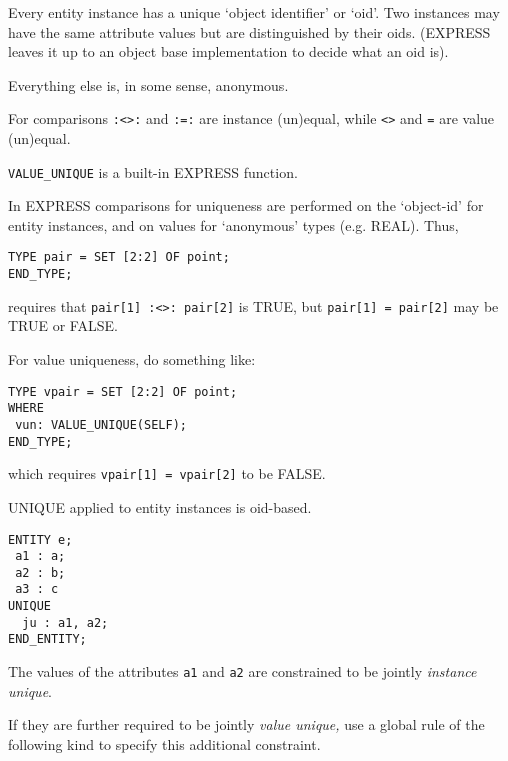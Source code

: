 \begin{remarks}
\remintro
{}

    Every entity instance has a unique `object identifier' or `oid'.
Two instances may have the same attribute values but are distinguished
by their oids. (EXPRESS leaves it up to an object base implementation
to decide what an oid is).

    Everything else is, in some sense, anonymous.

    For comparisons \verb?:<>:? and \verb?:=:? are instance (un)equal,
while \verb?<>? and \verb?=? are value (un)equal.

\texttt{VALUE\_UNIQUE} is a built-in EXPRESS function.

\remend
\end{remarks}


    In EXPRESS comparisons for uniqueness 
are performed on the `object-id' for entity instances, and on values 
for `anonymous' types (e.g. REAL). Thus,
\begin{verbatim}
TYPE pair = SET [2:2] OF point;
END_TYPE;
\end{verbatim}
requires that \verb?pair[1] :<>: pair[2]? is TRUE, but \verb?pair[1] = pair[2]?
may be TRUE or FALSE.

    For value uniqueness, do something like:
\begin{verbatim}
TYPE vpair = SET [2:2] OF point;
WHERE
 vun: VALUE_UNIQUE(SELF);
END_TYPE;
\end{verbatim}
which requires \verb|vpair[1] = vpair[2]| to be FALSE.


\begin{remarks}
\remintro
{}

UNIQUE applied to entity instances is oid-based.

\remend
\end{remarks}


\begin{verbatim}
ENTITY e;
 a1 : a;
 a2 : b;
 a3 : c
UNIQUE
  ju : a1, a2;
END_ENTITY;
\end{verbatim}
The values of the attributes \texttt{a1} and \texttt{a2} are constrained 
to be jointly \emph{instance unique}. 

    If they are further required to be jointly \emph{value unique,}
use a global rule of the following kind to specify this additional
constraint.

